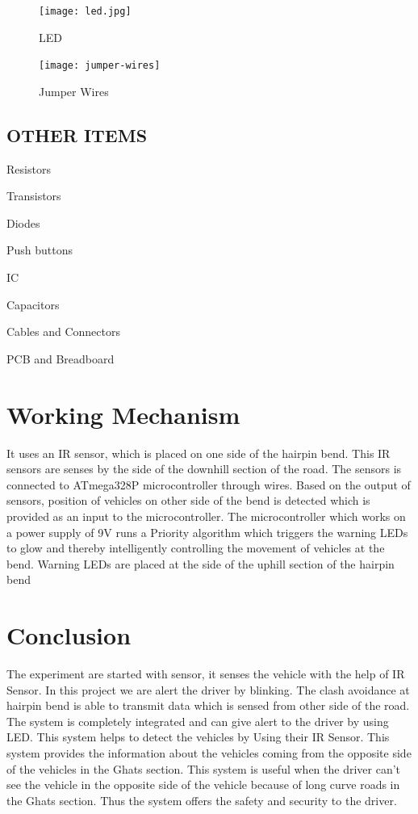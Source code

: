\documentclass[conference]{IEEEtran}
\begin{document}
    \begin{figure}[htbp]
        \centerline{\texttt{[image: led.jpg]}}
        \caption{LED}
        \label{fig}
    \end{figure}

    \begin{figure}[htbp]
        \centerline{\texttt{[image: jumper-wires]}}
        \caption{Jumper Wires}
        \label{fig}
    \end{figure}


    \subsection{OTHER ITEMS}
    \itemize
    \item Resistors
    \item Transistors
    \item Diodes
    \item Push buttons
    \item IC
    \item Capacitors
    \item Cables and Connectors
    \item PCB and Breadboard
    \enditemize


    \section{Working Mechanism}
    It uses an IR sensor, which is
    placed on one side of the hairpin bend. This IR sensors
    are senses by the side of the downhill section of the road.
    The sensors is connected to
    ATmega328P microcontroller through wires. Based on the
    output of sensors, position of vehicles on other side of the
    bend is detected which is provided as an input to the
    microcontroller. The microcontroller which works on a
    power supply of 9V runs a Priority algorithm which triggers
    the warning LEDs to glow and thereby intelligently
    controlling the movement of vehicles at the bend. Warning
    LEDs are placed at the side of the uphill section of the
    hairpin bend

    \section{Conclusion}
    The experiment are started with sensor, it senses the vehicle
    with the help of IR Sensor. In this project we are alert the
    driver by blinking. The clash avoidance at hairpin bend is
    able to transmit data which is sensed from other side of the
    road. The system is completely integrated and can give alert
    to the driver by using LED. This system helps to detect the
    vehicles by Using their IR Sensor. This system provides the
    information about the vehicles coming from the opposite side of the vehicles in the Ghats section. This system is useful
    when the driver can't see the vehicle in the opposite side of
    the vehicle because of long curve roads in the Ghats section.
    Thus the system offers the safety and security to the driver.
\end{document}
